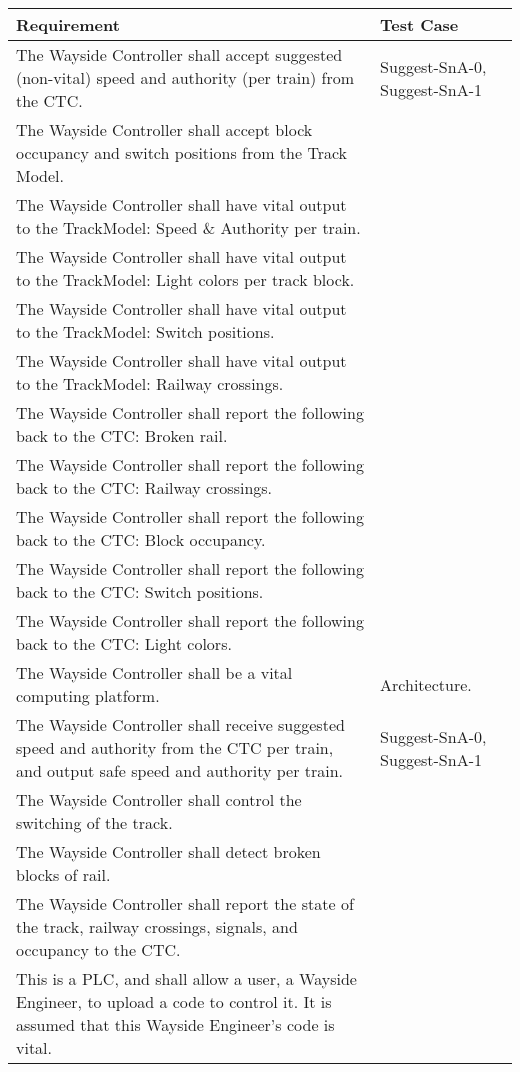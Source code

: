 \documentclass{scrreprt}
\begin{document}
    \begin{center}
            \begin{tabular}{p{} | l}
                Requirement & Test Case\\
                \hline\hline
The Wayside Controller shall accept suggested (non-vital) speed and authority (per train) from the CTC. & Suggest-SnA-0, Suggest-SnA-1\\\hline
The Wayside Controller shall accept block occupancy and switch positions from the Track Model. & \\\hline
The Wayside Controller shall have vital output to the TrackModel: Speed \& Authority per train. & \\\hline
The Wayside Controller shall have vital output to the TrackModel: Light colors per track block. & \\\hline
The Wayside Controller shall have vital output to the TrackModel: Switch positions. & \\\hline
The Wayside Controller shall have vital output to the TrackModel: Railway crossings. & \\\hline
The Wayside Controller shall report the following back to the CTC: Broken rail. & \\\hline
The Wayside Controller shall report the following back to the CTC: Railway crossings. & \\\hline
The Wayside Controller shall report the following back to the CTC: Block occupancy. & \\\hline
The Wayside Controller shall report the following back to the CTC: Switch positions. & \\\hline
The Wayside Controller shall report the following back to the CTC: Light colors. & \\\hline
The Wayside Controller shall be a vital computing platform. & Architecture. \\\hline
The Wayside Controller shall receive suggested speed and authority from the CTC
per train, and output safe speed and authority per train. & Suggest-SnA-0, Suggest-SnA-1\\\hline
The Wayside Controller shall control the switching of the track. & \\\hline
The Wayside Controller shall detect broken blocks of rail. & \\\hline
The Wayside Controller shall report the state of the track, railway crossings, signals,
and occupancy to the CTC. & \\\hline
This is a PLC, and shall allow a user, a Wayside Engineer, to upload a code to
control it. It is assumed that this Wayside Engineer’s code is vital. & \\
            \end{tabular}
    \end{center}
\end{document}
